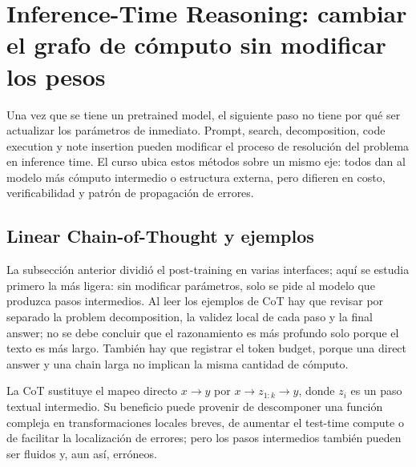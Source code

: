 \section{Inference-Time Reasoning: cambiar el grafo de cómputo sin modificar los pesos}

Una vez que se tiene un pretrained model, el siguiente paso no tiene por qué ser actualizar los parámetros de inmediato. Prompt, search, decomposition, code execution y note insertion pueden modificar el proceso de resolución del problema en inference time. El curso ubica estos métodos sobre un mismo eje: todos dan al modelo más cómputo intermedio o estructura externa, pero difieren en costo, verificabilidad y patrón de propagación de errores.




\subsection{Linear Chain-of-Thought y ejemplos}

La subsección anterior dividió el post-training en varias interfaces; aquí se estudia primero la más ligera: sin modificar parámetros, solo se pide al modelo que produzca pasos intermedios. Al leer los ejemplos de CoT hay que revisar por separado la problem decomposition, la validez local de cada paso y la final answer; no se debe concluir que el razonamiento es más profundo solo porque el texto es más largo. También hay que registrar el token budget, porque una direct answer y una chain larga no implican la misma cantidad de cómputo.

La CoT sustituye el mapeo directo $x\rightarrow y$ por $x\rightarrow z_{1:k}\rightarrow y$, donde $z_i$ es un paso textual intermedio. Su beneficio puede provenir de descomponer una función compleja en transformaciones locales breves, de aumentar el test-time compute o de facilitar la localización de errores; pero los pasos intermedios también pueden ser fluidos y, aun así, erróneos.




